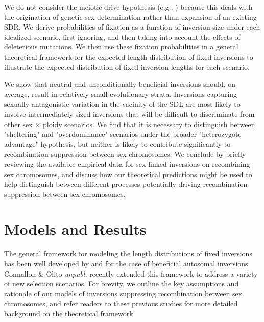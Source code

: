 \documentclass{article}
\newcommand\hl[1]{%
  \bgroup
  \hskip0pt\color{blue!80!black}%
  #1%
  \egroup
}
\begin{document}
\noindent We do not consider the meiotic drive hypothesis (e.g., \citealt{UbedaPatten2010}) because this deals with the origination of genetic sex-determination rather than expansion of an existing SDR. We derive probabilities of fixation as a function of inversion size under each idealized scenario, first ignoring, and then taking into account the effects of deleterious mutations. We then use these fixation probabilities in a general theoretical framework for the expected length distribution of fixed inversions \citep{vanValenLevins1968,Santos1986} to illustrate the expected distribution of fixed inversion lengths for each scenario. 

We show that neutral and unconditionally beneficial inversions should, on average, result in relatively small evolutionary strata. Inversions capturing sexually antagonistic variation in the vacinity of the SDL are most likely to involve intermediately-sized inversions that will be difficult to discriminate from other sex $\times$ ploidy scenarios. We find that it is necessary to distinguish between "sheltering" and "overdominance" scenarios under the broader "heterozygote advantage" hypothesis, but neither is likely to contribute significantly to recombination suppression between sex chromosomes. We conclude by briefly reviewing the available empirical data for sex-linked inversions on recombining sex chromosomes, and discuss how our theoretical predictions might be used to help distinguish between different processes potentially driving recombination suppression between sex chromosomes.



\section*{Models and Results} \label{sec:Models}

The general framework for modeling the length distributions of fixed inversions has been well developed by \citet{vanValenLevins1968} and \citet{Santos1986} for the case of beneficial autosomal inversions. \hl{Connallon \& Olito {\itshape unpubl.}} recently extended this framework to address a variety of new selection scenarios. For brevity, we outline the key assumptions and rationale of our models of inversions suppressing recombination between sex chromosomes, and refer readers to these previous studies for more detailed background on the theoretical framework.

\end{document}
